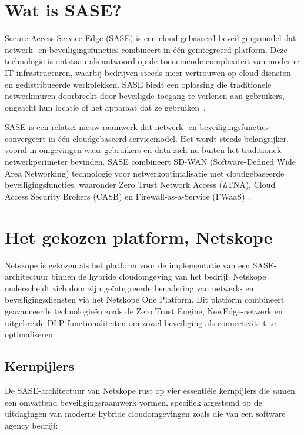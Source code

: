 \section{Wat is SASE?}
Secure Access Service Edge (SASE) is een cloud-gebaseerd beveiligingsmodel dat netwerk- en beveiligingsfuncties combineert in één geïntegreerd platform. Deze technologie is ontstaan als antwoord op de toenemende complexiteit van moderne IT-infrastructuren, waarbij bedrijven steeds meer vertrouwen op cloud-diensten en gedistribueerde werkplekken. SASE biedt een oplossing die traditionele netwerkmuren doorbreekt door beveiligde toegang te verlenen aan gebruikers, ongeacht hun locatie of het apparaat dat ze gebruiken~\autocite{KPN2023}.

SASE is een relatief nieuw raamwerk dat netwerk- en beveiligingsfuncties convergeert in één cloudgebaseerd servicemodel. Het wordt steeds belangrijker, vooral in omgevingen waar gebruikers en data zich nu buiten het traditionele netwerkperimeter bevinden. SASE combineert SD-WAN (Software-Defined Wide Area Networking) technologie voor netwerkoptimalisatie met cloudgebaseerde beveiligingsfuncties, waaronder Zero Trust Network Access (ZTNA), Cloud Access Security Brokers (CASB) en Firewall-as-a-Service (FWaaS)~\autocite{ZPE2025}.

\section{Het gekozen platform, Netskope}
Netskope is gekozen als het platform voor de implementatie van een SASE-architectuur binnen de hybride cloudomgeving van het bedrijf. Netskope onderscheidt zich door zijn geïntegreerde benadering van netwerk- en beveiligingsdiensten via het Netskope One Platform. Dit platform combineert geavanceerde technologieën zoals de Zero Trust Engine, NewEdge-netwerk en uitgebreide DLP-functionaliteiten om zowel beveiliging als connectiviteit te optimaliseren~\autocite{Netskope2025-1}.

\subsection{Kernpijlers}
De SASE-architectuur van Netskope rust op vier essentiële kernpijlers die samen een omvattend beveiligingsraamwerk vormen, specifiek afgestemd op de uitdagingen van moderne hybride cloudomgevingen zoals die van een software agency bedrijf:

